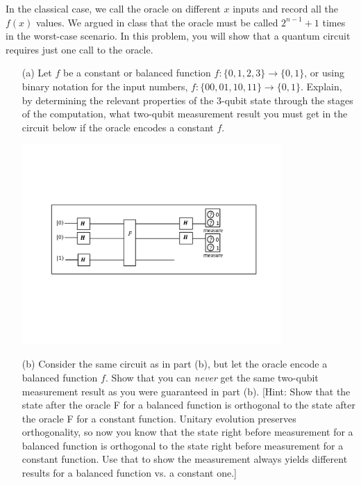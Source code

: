 \documentclass[12pt,letterpaper,boxed,cm]{hmcpset}
\begin{document}
\begin{problem}[1.]
    In the classical case, we call the oracle on different $x$ inputs and record all the $f(x)$ values.  We argued in class that the oracle must be called $2^{n-1}+1$ times in the worst-case scenario.  In this problem, you will show that a quantum circuit requires just one call to the oracle.   
    \begin{enumerate}
        \item [(a)]  Let $f$ be a constant or balanced function $f:\{0,1,2,3\} \rightarrow \{0,1\}$, or using binary notation for the input numbers, $f:\{00,01,10,11\} \rightarrow \{0,1\}$.  Explain, by determining the relevant properties of the 3-qubit state through the stages of the computation, what two-qubit measurement result you must get in the circuit below if the oracle encodes a constant $f$.
        \begin{center}
            \includegraphics[width=280pt]{fig2-1-0.pdf}
        \end{center}
        \item [(b)] Consider the same circuit as in part (b), but let the oracle encode a balanced function $f$.  Show that you can \textit{never} get the same two-qubit measurement result as you were guaranteed in part (b).  [Hint:  Show that the state after the oracle F for a balanced function is orthogonal to the state after the oracle F for a constant function.  Unitary evolution preserves orthogonality, so now you know that the state right before measurement for a balanced function is orthogonal to the state right before measurement for a constant function.  Use that to show the measurement always yields different results for a balanced function vs. a constant one.]
    \end{enumerate}
\end{problem}
\end{document}
